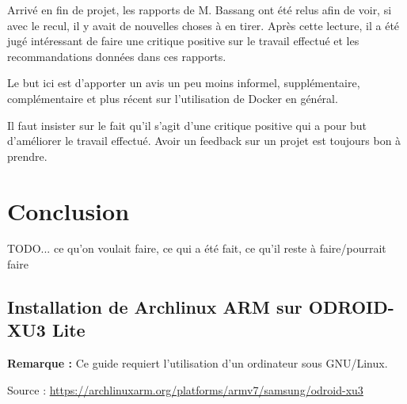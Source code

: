 \documentclass[11pt,a4paper,oneside]{report}
\newcommand{\odroid}{ODROID-XU3 Lite }
\begin{document}
Arrivé en fin de projet, les rapports de M. Bassang ont été relus afin de voir, si avec le recul, il y avait de nouvelles choses à en tirer. Après cette lecture, il a été jugé intéressant de faire une critique positive sur le travail effectué et les recommandations données dans ces rapports. 

Le but ici est d'apporter un avis un peu moins informel, supplémentaire, complémentaire et plus récent sur l'utilisation de Docker en général.

Il faut insister sur le fait qu'il s'agit d'une critique positive qui a pour but d'améliorer le travail effectué. Avoir un feedback sur un projet est toujours bon à prendre.




\chapter{Conclusion}
TODO... ce qu'on voulait faire, ce qui a été fait, ce qu'il reste à faire/pourrait faire


\nocite{*} %



\begin{appendices}
\chapter{Installation de Archlinux ARM sur \odroid}\label{install_alarm_odroid}

\textbf{Remarque : }Ce guide requiert l'utilisation d'un ordinateur sous GNU/Linux.

Source : \url{https://archlinuxarm.org/platforms/armv7/samsung/odroid-xu3}



\end{appendices}
\end{document}
